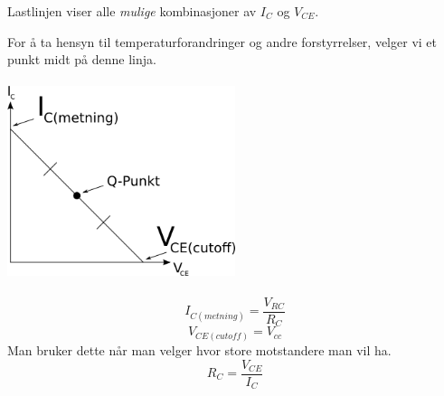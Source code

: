 Lastlinjen viser alle \emph{mulige} kombinasjoner av $I_C$ og $V_{CE}$.

For å ta hensyn til temperaturforandringer og andre forstyrrelser,
velger vi et punkt midt på denne linja.
\\\\
\includegraphics[width=0.5\textwidth]{./img/lastlinje}
\\\\
$$I_{C(metning)} = \frac{V_{RC}}{R_C}$$
$$V_{CE(cutoff)} = V_{cc}$$
Man bruker dette når man velger hvor store motstandere man vil ha.
$$R_C = \frac{V_{CE}}{I_C}$$

